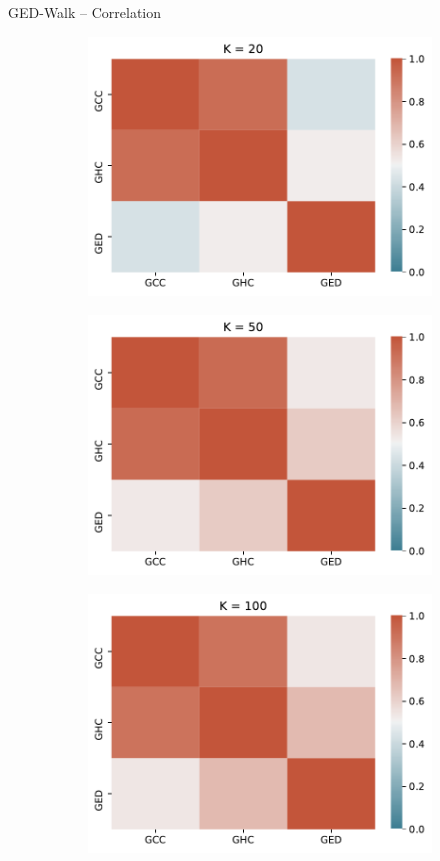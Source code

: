 \documentclass[10pt,titlepage,english,presentation]{beamer}
\begin{document}
\begin{frame}[t]{GED-Walk -- Correlation}
\begin{figure}
\begin{subfigure}[t]{.33\textwidth}
\centering
\includegraphics[width=.9\textwidth]{./images/ged-corrs-k20.pdf}
\end{subfigure}\hfill
\begin{subfigure}[t]{.33\textwidth}
\centering
\includegraphics[width=.9\textwidth]{./images/ged-corrs-k50.pdf}
\end{subfigure}\hfill
\begin{subfigure}[t]{.33\textwidth}
\centering
\includegraphics[width=.9\textwidth]{./images/ged-corrs-k100.pdf}
\end{subfigure}
\end{figure}
\end{frame}
\end{document}
